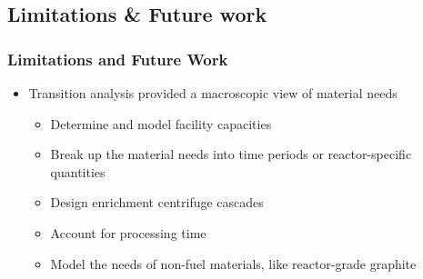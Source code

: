 \subsection{Limitations \& Future work}
\begin{frame}
      \frametitle{Limitations and Future Work}
      \begin{itemize}
            \item Transition analysis provided a macroscopic view of 
                  material needs 
            \begin{itemize}
                  \item<2-> Determine and model facility capacities
                  \item<2-> Break up the material needs into time periods or 
                        reactor-specific quantities
                  \item<2-> Design enrichment centrifuge cascades 
                  \item<2-> Account for processing time 
                  \item<2-> Model the needs of non-fuel materials, 
                        like reactor-grade graphite
            \end{itemize}

      \end{itemize} 
\end{frame}